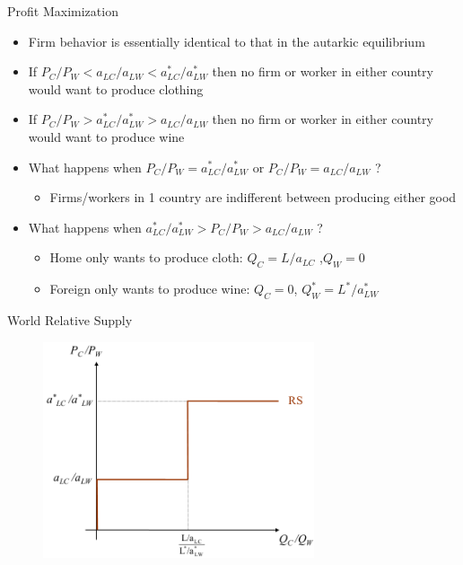 \documentclass[10pt,hyperref={CJKbookmarks=true},xcolor=dvipsnames,aspectratio=169]{beamer}
\begin{document}
\begin{frame}{Profit Maximization}

\begin{itemize}
\item Firm behavior is essentially identical to that in the autarkic equilibrium 
\item If $P_{C}/P_{W}<a_{LC}/a_{LW}<a{}_{LC}^{*}/a_{LW}^{*}$ then no firm
or worker in either country would want to produce clothing 
\item If $P_{C}/P_{W}>a_{LC}^{*}/a_{LW}^{*}>a_{LC}/a_{LW}$ then no firm
or worker in either country would want to produce wine 
\item What happens when $P_{C}/P_{W}=a{}_{LC}^{*}/a_{LW}^{*}$ or $P_{C}/P_{W}=a_{LC}/a_{LW}$
?

\begin{itemize}
\item Firms/workers in 1 country are indifferent between producing either
good 
\end{itemize}
\item What happens when $a_{LC}^{*}/a_{LW}^{*}>P_{C}/P_{W}>a_{LC}/a_{LW}$
? 

\begin{itemize}
\item Home only wants to produce cloth: $Q_{C}=L/a_{LC}$ ,$Q_{W}=0$
\item Foreign only wants to produce wine: $Q_{C}=0$, $Q_{W}^{*}=L^{*}/a_{LW}^{*}$ 
\end{itemize}
\end{itemize}
\end{frame}

\begin{frame}{World Relative Supply}


\begin{figure}
\begin{centering}
\includegraphics[width=8cm]{fig/ricardo/lec3-07}
\par\end{centering}

\end{figure}

\end{frame}
\end{document}
